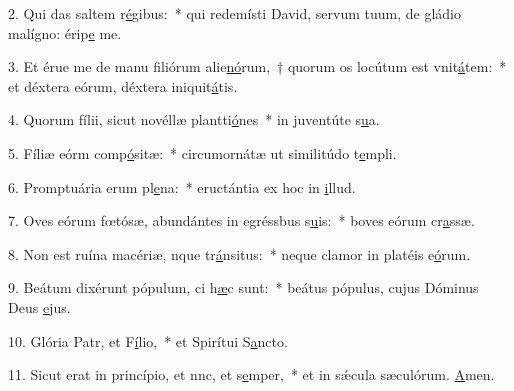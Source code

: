 2. Qui das saltem r\uline{é}gibus:~* qui redemísti David, servum tuum, de gládio malígno: érip\uline{e} me.\par 
3. Et érue me de manu filiórum alie\uline{nó}rum,~† quorum os locútum est vnit\uline{á}tem:~* et déxtera eórum, déxtera iniquit\uline{á}tis.\par 
4. Quorum fílii, sicut novéllæ plantti\uline{ó}nes~* in juventúte s\uline{u}a.\par 
5. Fíliæ eórm comp\uline{ó}sitæ:~* circumornátæ ut similitúdo t\uline{e}mpli.\par 
6. Promptuária erum pl\uline{e}na:~* eructántia ex hoc in \uline{i}llud.\par 
7. Oves eórum fœtósæ, abundántes in egréssbus s\uline{u}is:~* boves eórum cr\uline{a}ssæ.\par 
8. Non est ruína macériæ, nque tr\uline{á}nsitus:~* neque clamor in platéis e\uline{ó}rum.\par 
9. Beátum dixérunt pópulum, ci h\uline{æ}c sunt:~* beátus pópulus, cujus Dóminus Deus \uline{e}jus.\par 
10. Glória Patr, et F\uline{í}lio,~* et Spirítui S\uline{a}ncto.\par 
11. Sicut erat in princípio, et nnc, et s\uline{e}mper,~* et in sǽcula sæculórum. \uline{A}men.\par 
